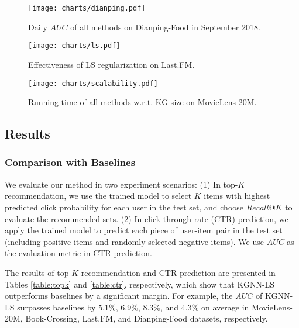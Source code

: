 \documentclass[sigconf]{acmart}
\begin{document}
    		
    		\begin{figure*}
  				\begin{minipage}[t]{0.3\linewidth}    				\centering 
    				\texttt{[image: charts/dianping.pdf]}
    				\vspace{-0.2in}
    				\caption{Daily $AUC$ of all methods on Dianping-Food in September 2018.} 
    				\label{fig:food} 
  				\end{minipage}
  				\hfill
  				\begin{minipage}[t]{0.3\linewidth} 
    				\centering 
    				\texttt{[image: charts/ls.pdf]}
    				\vspace{-0.2in}
    				\caption{Effectiveness of LS regularization on Last.FM.} 
    				\label{fig:ls} 
  				\end{minipage}
  				\hfill
  				\begin{minipage}[t]{0.315\linewidth} 
    				\centering 
    				\texttt{[image: charts/scalability.pdf]}
    				\vspace{-0.2in}
    				\caption{Running time of all methods w.r.t. KG size on MovieLens-20M.} 
    				\label{fig:scalability} 
  				\end{minipage} 
			\end{figure*}
		
	\subsection{Results}
		\subsubsection{Comparison with Baselines}			We evaluate our method in two experiment scenarios:
			(1) In top-$K$ recommendation, we use the trained model to select $K$ items with highest predicted click probability for each user in the test set, and choose $Recall@K$ to evaluate the recommended sets.
			(2) In click-through rate (CTR) prediction, we apply the trained model to predict each piece of user-item pair in the test set (including positive items and randomly selected negative items).
			We use $AUC$ as the evaluation metric in CTR prediction.
			
			The results of top-$K$ recommendation and CTR prediction are presented in Tables \ref{table:topk} and \ref{table:ctr}, respectively, which show that KGNN-LS outperforms baselines by a significant margin.
			For example, the $AUC$ of KGNN-LS surpasses baselines by $5.1\%$, $6.9\%$, $8.3\%$, and $4.3\%$ on average in MovieLens-20M, Book-Crossing, Last.FM, and Dianping-Food datasets, respectively.
        				
\end{document}

